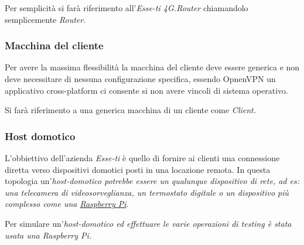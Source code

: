 Per semplicità si farà riferimento all'\textit{Esse-ti 4G.Router} chiamandolo semplicemente \textit{Router}.

\subsubsection{Macchina del cliente}
\label{subsec:macchina-cliente}

Per avere la massima flessibilità la macchina del cliente deve essere generica e non deve necessitare di nessuna configurazione specifica, essendo OpnenVPN un applicativo cross-platform ci consente si non avere vincoli di sistema operativo.

Si farà riferimento a una generica macchina di un cliente come \it{Client}.

\subsubsection{Host domotico}

L'obbiettivo dell'azienda \textit{Esse-ti} è quello di fornire ai clienti una connessione diretta verso dispositivi domotici posti in una locazione remota. In questa topologia un'\it{host-domotico} potrebbe essere un qualunque dispositivo di rete, ad es: una telecamera di videosorveglianza, un termostato digitale o un dispositivo più complesso come una \href{https://en.wikipedia.org/wiki/Raspberry_Pi}{Raspberry Pi}.

Per simulare un'\it{host-domotico} ed effettuare le varie operazioni di testing è stata usata una \textit{Raspberry Pi}.


